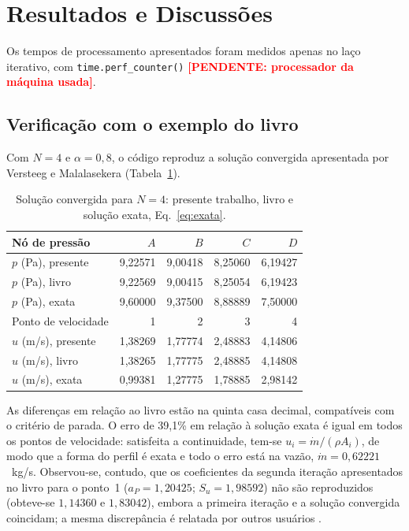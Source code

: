 \documentclass[11pt,a4paper]{article}
\newcommand{\pendente}[1]{\textcolor{red}{\textbf{[PENDENTE: #1]}}}
\begin{document}
\section{Resultados e Discussões}

Os tempos de processamento apresentados foram medidos apenas no laço
iterativo, com \texttt{time.perf\_counter()} \pendente{processador da
máquina usada}.

\subsection{Verificação com o exemplo do livro}

Com $N=4$ e $\alpha=0{,}8$, o código reproduz a solução convergida
apresentada por Versteeg e Malalasekera (Tabela~\ref{tab:livro}).

\begin{table}[H]
\centering
\caption{Solução convergida para $N=4$: presente trabalho, livro
\cite{versteeg} e solução exata, Eq.~\eqref{eq:exata}.}
\label{tab:livro}
\begin{tabular}{lrrrr}
\hline
Nó de pressão & $A$ & $B$ & $C$ & $D$\\
\hline
$p$ (Pa), presente   & 9,22571 & 9,00418 & 8,25060 & 6,19427\\
$p$ (Pa), livro      & 9,22569 & 9,00415 & 8,25054 & 6,19423\\
$p$ (Pa), exata      & 9,60000 & 9,37500 & 8,88889 & 7,50000\\
\hline
Ponto de velocidade & 1 & 2 & 3 & 4\\
\hline
$u$ (m/s), presente  & 1,38269 & 1,77774 & 2,48883 & 4,14806\\
$u$ (m/s), livro     & 1,38265 & 1,77775 & 2,48885 & 4,14808\\
$u$ (m/s), exata     & 0,99381 & 1,27775 & 1,78885 & 2,98142\\
\hline
\end{tabular}
\end{table}

As diferenças em relação ao livro estão na quinta casa decimal, compatíveis
com o critério de parada. O erro de 39,1\% em relação à solução exata é
igual em todos os pontos de velocidade: satisfeita a continuidade, tem-se
$u_i=\dot m/(\rho A_i)$, de modo que a forma do perfil é exata e todo o erro
está na vazão, $\dot m=0{,}62221$~kg/s. Observou-se, contudo, que os
coeficientes da segunda iteração apresentados no livro para o ponto~1
($a_P=1{,}20425$; $S_u=1{,}98592$) não são reproduzidos (obteve-se
$1{,}14360$ e $1{,}83042$), embora a primeira iteração e a solução
convergida coincidam; a mesma discrepância é relatada por outros usuários
\cite{cfdonline}.
\end{document}
